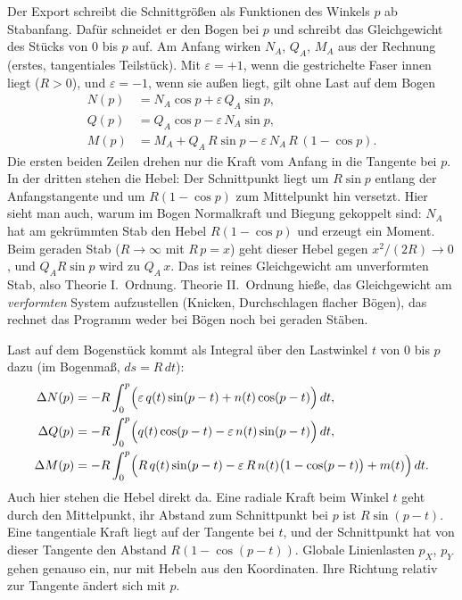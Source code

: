 Der Export schreibt die Schnittgrößen als Funktionen des Winkels $p$ ab Stabanfang. Dafür schneidet
er den Bogen bei $p$ und schreibt das Gleichgewicht des Stücks von $0$ bis $p$ auf. Am Anfang wirken
$N_A$, $Q_A$, $M_A$ aus der Rechnung (erstes, tangentiales Teilstück). Mit $\varepsilon = +1$, wenn
die gestrichelte Faser innen liegt ($R > 0$), und $\varepsilon = -1$, wenn sie außen liegt, gilt
ohne Last auf dem Bogen
\begin{align*}
  N(p) &= N_A\cos p + \varepsilon\,Q_A\sin p , \\
  Q(p) &= Q_A\cos p - \varepsilon\,N_A\sin p , \\
  M(p) &= M_A + Q_A\,R\sin p - \varepsilon\,N_A\,R\,(1-\cos p) .
\end{align*}
Die ersten beiden Zeilen drehen nur die Kraft vom Anfang in die Tangente bei $p$. In der dritten
stehen die Hebel: Der Schnittpunkt liegt um $R\sin p$ entlang der Anfangstangente und um
$R(1-\cos p)$ zum Mittelpunkt hin versetzt.
Hier sieht man auch, warum im Bogen Normalkraft und Biegung gekoppelt sind: $N_A$ hat am
gekrümmten Stab den Hebel $R(1-\cos p)$ und erzeugt ein Moment. Beim geraden Stab ($R \to \infty$
mit $R\,p = x$) geht dieser Hebel gegen $x^2/(2R) \to 0$, und $Q_A R\sin p$ wird zu $Q_A\,x$. Das
ist reines Gleichgewicht am unverformten Stab, also Theorie I.~Ordnung. Theorie II.~Ordnung hieße,
das Gleichgewicht am \emph{verformten} System aufzustellen (Knicken, Durchschlagen flacher Bögen),
das rechnet das Programm weder bei Bögen noch bei geraden Stäben.

Last auf dem Bogenstück kommt als Integral über den Lastwinkel $t$ von $0$ bis $p$ dazu (im Bogenmaß,
$ds = R\,dt$):
\begin{align*}
  \Delta N(p) &= -R\int_0^p \Bigl(\varepsilon\,q(t)\sin(p-t) + n(t)\cos(p-t)\Bigr)\,dt , \\
  \Delta Q(p) &= -R\int_0^p \Bigl(q(t)\cos(p-t) - \varepsilon\,n(t)\sin(p-t)\Bigr)\,dt , \\
  \Delta M(p) &= -R\int_0^p \Bigl(R\,q(t)\sin(p-t) - \varepsilon\,R\,n(t)\bigl(1-\cos(p-t)\bigr)
                + m(t)\Bigr)\,dt .
\end{align*}
Auch hier stehen die Hebel direkt da. Eine radiale Kraft beim Winkel $t$ geht durch den
Mittelpunkt, ihr Abstand zum Schnittpunkt bei $p$ ist $R\sin(p-t)$. Eine tangentiale Kraft liegt
auf der Tangente bei $t$, und der Schnittpunkt hat von dieser Tangente den Abstand $R(1-\cos(p-t))$.
Globale Linienlasten $p_X$, $p_Y$ gehen genauso ein, nur mit Hebeln aus den Koordinaten. Ihre
Richtung relativ zur Tangente ändert sich mit $p$.

